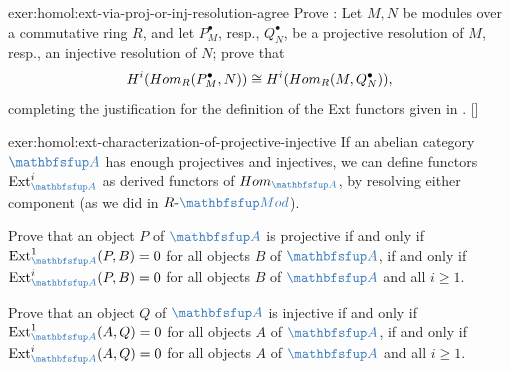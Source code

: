 \begin{exer}{\exerused{}}{exer:homol:ext-via-proj-or-inj-resolution-agree}
  Prove : Let $M, N$ be modules over a
  commutative ring $R$, and let $P_M^\bullet$, resp., $Q_N^\bullet$,
  be a projective resolution of $M$, resp., an injective resolution of
  $N$; prove that
  \[
    H^i(Hom_R(P_M^\bullet, N)) \cong H^i(Hom_R(M, Q_N^\bullet)),
  \]
  completing the justification for the definition of the Ext functors
  given in
  . []
\end{exer}
\begin{exer}{}{exer:homol:ext-characterization-of-projective-injective}
  If an abelian category $\categ{A}$ has enough projectives and
  injectives, we can define functors
  $\operatorname{Ext}^i_{\categ{A}}$ as derived functors of
  $\Hom_{\categ{A}}$, by resolving either component (as we did in
  $R\text{-}\categ{Mod}$).

  Prove that an object $P$ of $\categ{A}$ is projective if and only if
  $\operatorname{Ext}^1_{\categ{A}}(P, B) = 0$ for all objects $B$ of
  $\categ{A}$, if and only if
  $\operatorname{Ext}^i_{\categ{A}}(P, B) = 0$ for all objects $B$ of
  $\categ{A}$ and all $i \ge 1$.

  Prove that an object $Q$ of $\categ{A}$ is injective if and only if
  $\operatorname{Ext}^1_{\categ{A}}(A, Q) = 0$ for all objects $A$ of
  $\categ{A}$, if and only if
  $\operatorname{Ext}^i_{\categ{A}}(A, Q) = 0$ for all objects $A$ of
  $\categ{A}$ and all $i \ge 1$.
\end{exer}
